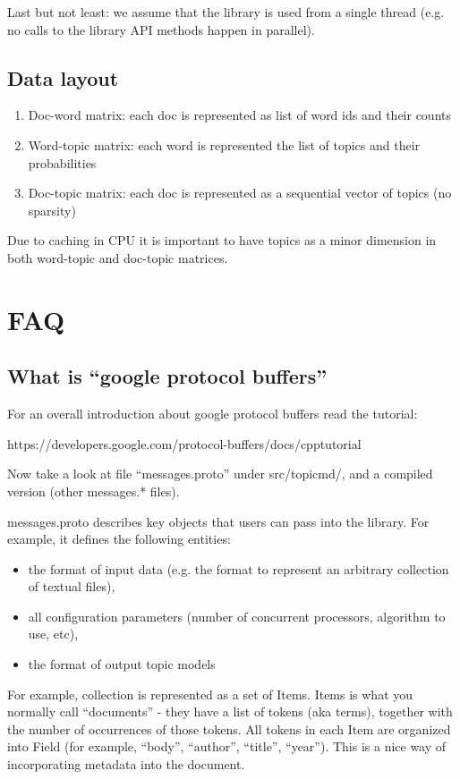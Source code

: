 \documentclass[11pt,a4paper,twoside]{report}
\begin{document}
Last but not least:
we assume that the library is used from a single thread
(e.g. no calls to the library API methods happen in parallel).

\subsection{Data layout}
\begin{enumerate}
    \item Doc-word matrix: each doc is represented as list of word ids and their counts
    \item Word-topic matrix: each word is represented the list of topics and their probabilities
    \item Doc-topic matrix: each doc is represented as a sequential vector of topics (no sparsity)
\end{enumerate}

Due to caching in CPU it is important to have topics as a minor dimension in both word-topic and doc-topic matrices.

\section{FAQ}

\subsection{What is ``google protocol buffers''}

For an overall introduction about google protocol buffers read the tutorial:

https://developers.google.com/protocol-buffers/docs/cpptutorial

Now take a look at file ``messages.proto'' under src/topicmd/,
and a compiled version (other messages.* files).

messages.proto describes key objects that users can pass into the library.
For example, it defines the following entities:
\begin{itemize}
    \item the format of input data 
        (e.g. the format to represent an arbitrary collection of textual files),
    \item all configuration parameters (number of concurrent processors, algorithm to use, etc),
    \item the format of output topic models
 \end{itemize}

For example, collection is represented as a set of Items.
Items is what you normally call ``documents'' - they have a list of tokens (aka terms), 
together with the number of occurrences of those tokens.
All tokens in each Item are organized into Field (for example, ``body'', ``author'', ``title'', ``year'').
This is a nice way of incorporating metadata into the document.
\end{document}
